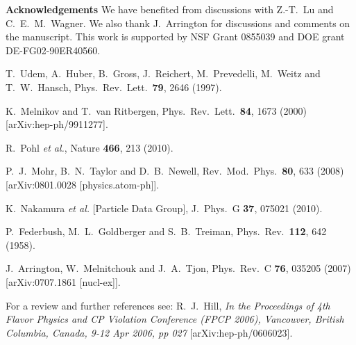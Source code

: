 \documentclass[12pt]{article}
\begin{document}
\vskip 0.2in
\noindent
{\bf Acknowledgements}
\vskip 0.1in
\noindent
We have benefited from discussions with Z.-T.~Lu and C.~E.~M.~Wagner.   We also thank
J.~Arrington for discussions and comments on the manuscript. 
This work is supported by NSF Grant 0855039 and DOE grant DE-FG02-90ER40560. 

\begin{thebibliography}{99}

  T.~Udem, A.~Huber, B.~Gross, J.~Reichert, M.~Prevedelli, M.~Weitz and T.~W.~Hansch,
  Phys.\ Rev.\ Lett.\  {\bf 79}, 2646 (1997).

  K.~Melnikov and T.~van Ritbergen,
  Phys.\ Rev.\ Lett.\  {\bf 84}, 1673 (2000)
  [arXiv:hep-ph/9911277].

  R.~Pohl {\it et al.},
  Nature {\bf 466}, 213 (2010).

  P.~J.~Mohr, B.~N.~Taylor and D.~B.~Newell,
  Rev.\ Mod.\ Phys.\  {\bf 80}, 633 (2008)
  [arXiv:0801.0028 [physics.atom-ph]].

  K.~Nakamura {\it et al.}  [Particle Data Group],
  J.\ Phys.\ G {\bf 37}, 075021 (2010).

  P.~Federbush, M.~L.~Goldberger and S.~B.~Treiman,
  Phys.\ Rev.\  {\bf 112}, 642 (1958).

  J.~Arrington, W.~Melnitchouk and J.~A.~Tjon,
  Phys.\ Rev.\  C {\bf 76}, 035205 (2007)
  [arXiv:0707.1861 [nucl-ex]].
  
For a review and further references see: 
  R.~J.~Hill,
{\it In the Proceedings of 4th Flavor Physics and CP Violation Conference (FPCP 2006), Vancouver, British Columbia, Canada, 9-12 Apr 2006, pp
027}
  [arXiv:hep-ph/0606023].


\end{thebibliography}
\end{document}
